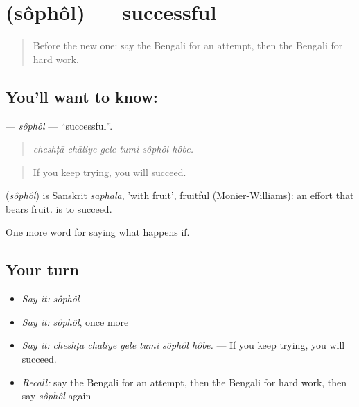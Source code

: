 \section[\texorpdfstring{\bn{সফল} (sôphôl)}{সফল (sôphôl)}]{ (sôphôl) — successful}

\label{lesson:BN-C376-sophol}



\begin{quote}
Before the new one: say the Bengali for an attempt, then the Bengali for hard work.
\end{quote}

\subsection*{You'll want to know: }
\textbf{} — \emph{sôphôl} — \textquotedblleft{}successful\textquotedblright{}.

\begin{quote}
     
\end{quote}

\begin{quote}
\emph{cheshṭā chāliye gele tumi sôphôl hôbe.}
\end{quote}

\begin{quote}
If you keep trying, you will succeed.
\end{quote}

\begin{cousinweb}
\textbf{} (\emph{sôphôl}) is Sanskrit \emph{saphala}, 'with fruit', fruitful (Monier-Williams): an effort that bears fruit.   is to succeed.
\end{cousinweb}

\begin{grammarlens}[title={What you've built}]
One more word for saying what happens if.
\end{grammarlens}

\subsection*{Your turn}
\begin{itemize}
\raggedright
  \item \emph{Say it:} \emph{sôphôl}
  \item \emph{Say it:} \emph{sôphôl}, once more
  \item \emph{Say it:} \emph{cheshṭā chāliye gele tumi sôphôl hôbe.} — If you keep trying, you will succeed.
  \item \emph{Recall:} say the Bengali for an attempt, then the Bengali for hard work, then say \emph{sôphôl} again
\end{itemize}

